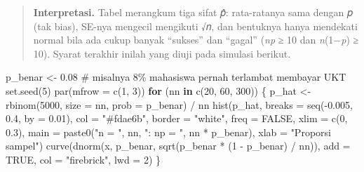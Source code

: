 \documentclass[
  indonesian,
  letterpaper,
]{book}
\newenvironment{Shaded}{\begin{snugshade}}{\end{snugshade}}
\newcommand{\AttributeTok}[1]{\textcolor[rgb]{0.40,0.45,0.13}{#1}}
\newcommand{\CommentTok}[1]{\textcolor[rgb]{0.37,0.37,0.37}{#1}}
\newcommand{\ConstantTok}[1]{\textcolor[rgb]{0.56,0.35,0.01}{#1}}
\newcommand{\ControlFlowTok}[1]{\textcolor[rgb]{0.00,0.23,0.31}{\textbf{#1}}}
\newcommand{\DecValTok}[1]{\textcolor[rgb]{0.68,0.00,0.00}{#1}}
\newcommand{\FloatTok}[1]{\textcolor[rgb]{0.68,0.00,0.00}{#1}}
\newcommand{\FunctionTok}[1]{\textcolor[rgb]{0.28,0.35,0.67}{#1}}
\newcommand{\NormalTok}[1]{\textcolor[rgb]{0.00,0.23,0.31}{#1}}
\newcommand{\OtherTok}[1]{\textcolor[rgb]{0.00,0.23,0.31}{#1}}
\newcommand{\SpecialCharTok}[1]{\textcolor[rgb]{0.37,0.37,0.37}{#1}}
\newcommand{\StringTok}[1]{\textcolor[rgb]{0.13,0.47,0.30}{#1}}
\begin{document}
\begin{quote}
\textbf{Interpretasi.} Tabel merangkum tiga sifat 𝑝̂: rata-ratanya sama
dengan 𝑝 (tak bias), SE-nya mengecil mengikuti √𝑛, dan bentuknya hanya
mendekati normal bila ada cukup banyak ``sukses'' dan ``gagal''
(\emph{np} ≥ 10 dan \emph{n}(1−\emph{p}) ≥ 10). Syarat terakhir inilah
yang diuji pada simulasi berikut.
\end{quote}

\begin{Shaded}
\begin{Highlighting}[]
\NormalTok{p\_benar }\OtherTok{\textless{}{-}} \FloatTok{0.08} \CommentTok{\# misalnya 8\% mahasiswa pernah terlambat membayar UKT}
\FunctionTok{set.seed}\NormalTok{(}\DecValTok{5}\NormalTok{)}
\FunctionTok{par}\NormalTok{(}\AttributeTok{mfrow =} \FunctionTok{c}\NormalTok{(}\DecValTok{1}\NormalTok{, }\DecValTok{3}\NormalTok{))}
\ControlFlowTok{for}\NormalTok{ (nn }\ControlFlowTok{in} \FunctionTok{c}\NormalTok{(}\DecValTok{20}\NormalTok{, }\DecValTok{60}\NormalTok{, }\DecValTok{300}\NormalTok{)) \{}
\NormalTok{p\_hat }\OtherTok{\textless{}{-}} \FunctionTok{rbinom}\NormalTok{(}\DecValTok{5000}\NormalTok{, }\AttributeTok{size =}\NormalTok{ nn, }\AttributeTok{prob =}\NormalTok{ p\_benar) }\SpecialCharTok{/}\NormalTok{ nn}
\FunctionTok{hist}\NormalTok{(p\_hat, }\AttributeTok{breaks =} \FunctionTok{seq}\NormalTok{(}\SpecialCharTok{{-}}\FloatTok{0.005}\NormalTok{, }\FloatTok{0.4}\NormalTok{, }\AttributeTok{by =} \FloatTok{0.01}\NormalTok{), }\AttributeTok{col =} \StringTok{"\#fdae6b"}\NormalTok{, }\AttributeTok{border =} \StringTok{"white"}\NormalTok{,}
\AttributeTok{freq =} \ConstantTok{FALSE}\NormalTok{, }\AttributeTok{xlim =} \FunctionTok{c}\NormalTok{(}\DecValTok{0}\NormalTok{, }\FloatTok{0.3}\NormalTok{),}
\AttributeTok{main =} \FunctionTok{paste0}\NormalTok{(}\StringTok{"n = "}\NormalTok{, nn, }\StringTok{": np = "}\NormalTok{, nn }\SpecialCharTok{*}\NormalTok{ p\_benar), }\AttributeTok{xlab =} \StringTok{"Proporsi sampel"}\NormalTok{)}
\FunctionTok{curve}\NormalTok{(}\FunctionTok{dnorm}\NormalTok{(x, p\_benar, }\FunctionTok{sqrt}\NormalTok{(p\_benar }\SpecialCharTok{*}\NormalTok{ (}\DecValTok{1} \SpecialCharTok{{-}}\NormalTok{ p\_benar) }\SpecialCharTok{/}\NormalTok{ nn)), }\AttributeTok{add =} \ConstantTok{TRUE}\NormalTok{,}
\AttributeTok{col =} \StringTok{"firebrick"}\NormalTok{, }\AttributeTok{lwd =} \DecValTok{2}\NormalTok{)}
\NormalTok{\}}
\end{Highlighting}
\end{Shaded}
\end{document}
